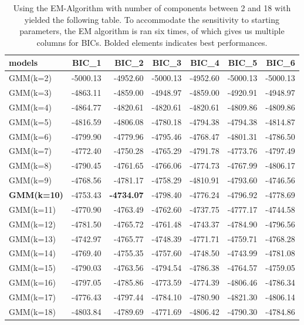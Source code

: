 \documentclass[12pt]{article}
\begin{document}
    \begin{table}[H]
        \centering
        \caption{Using the EM-Algorithm with number of components between 2 and 18 with yielded the following table. To accommodate the sensitivity to starting parameters, the EM algorithm is ran six times, of which gives us multiple columns for BICs. Bolded elements indicates best performances.}
        \begin{tabular}{lrrrrrr}
            \toprule
                models &    BIC\_1 &    BIC\_2 &    BIC\_3 &    BIC\_4 &    BIC\_5 &    BIC\_6 \\
            \midrule
            GMM(k=2) & -5000.13 & -4952.60 & -5000.13 & -4952.60 & -5000.13 & -5000.13 \\
            GMM(k=3) & -4863.11 & -4859.00 & -4948.97 & -4859.00 & -4920.91 & -4948.97 \\
            GMM(k=4) & -4864.77 & -4820.61 & -4820.61 & -4820.61 & -4809.86 & -4809.86 \\
            GMM(k=5) & -4816.59 & -4806.08 & -4780.18 & -4794.38 & -4794.38 & -4814.87 \\
            GMM(k=6) & -4799.90 & -4779.96 & -4795.46 & -4768.47 & -4801.31 & -4786.50 \\
            GMM(k=7) & -4772.40 & -4750.28 & -4765.29 & -4791.78 & -4773.76 & -4797.49 \\
            GMM(k=8) & -4790.45 & -4761.65 & -4766.06 & -4774.73 & -4767.99 & -4806.17 \\
            GMM(k=9) & -4768.56 & -4781.17 & -4758.29 & -4810.91 & -4793.60 & -4746.56 \\
            \textbf{GMM(k=10)} & -4753.43 & \textbf{-4734.07} & -4798.40 & -4776.24 & -4796.92 & -4778.69 \\
            GMM(k=11) & -4770.90 & -4763.49 & -4762.60 & -4737.75 & -4777.17 & -4744.58 \\
            GMM(k=12) & -4781.50 & -4765.72 & -4761.48 & -4743.37 & -4784.90 & -4796.56 \\
            GMM(k=13) & -4742.97 & -4765.77 & -4748.39 & -4771.71 & -4759.71 & -4768.28 \\
            GMM(k=14) & -4769.40 & -4755.35 & -4757.60 & -4748.50 & -4743.99 & -4781.08 \\
            GMM(k=15) & -4790.03 & -4763.56 & -4794.54 & -4786.38 & -4764.57 & -4759.05 \\
            GMM(k=16) & -4797.05 & -4785.86 & -4773.59 & -4774.39 & -4806.46 & -4786.34 \\
            GMM(k=17) & -4776.43 & -4797.44 & -4784.10 & -4780.90 & -4821.30 & -4806.14 \\
            GMM(k=18) & -4803.84 & -4789.69 & -4771.69 & -4806.42 & -4790.30 & -4784.86 \\
            \bottomrule
        \end{tabular}
    \end{table}
\end{document}
